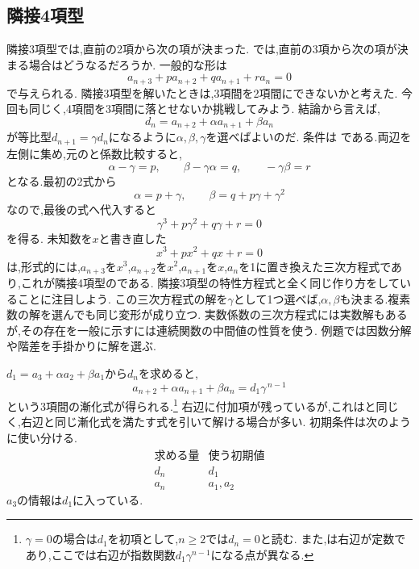 \subsection{隣接4項型}\label{節：隣接4項型}
隣接3項型では,直前の2項から次の項が決まった.
では,直前の3項から次の項が決まる場合はどうなるだろうか.
一般的な形は
\[
  a_{n+3}+pa_{n+2}+qa_{n+1}+ra_n=0
\]
で与えられる.
隣接3項型を解いたときは,3項間を2項間にできないかと考えた.
今回も同じく,4項間を3項間に落とせないか挑戦してみよう.
結論から言えば,
\[
  d_n=a_{n+2}+\alpha a_{n+1}+\beta a_n
\]
が等比型$d_{n+1}=\gamma d_n$になるように$\alpha,\beta,\gamma$を選べばよいのだ.
条件は
\BookMathLayout{\[
    a_{n+3}+\alpha a_{n+2}+\beta a_{n+1}=\gamma \left(a_{n+2}+\alpha a_{n+1}+\beta a_{n}\right)
  \]}{
  \[
    \begin{aligned}
      a_{n+3}+\alpha a_{n+2}+\beta a_{n+1}\\
      {}=\gamma\left(a_{n+2}+\alpha a_{n+1}+\beta a_n\right)
    \end{aligned}
  \]
}
である.両辺を左側に集め,元のと係数比較すると,
\[
  \alpha-\gamma=p,\qquad
  \beta-\gamma\alpha=q,\qquad
  -\gamma\beta=r
\]
となる.最初の2式から
\[
  \alpha=p+\gamma,\qquad
  \beta=q+p\gamma+\gamma^2
\]
なので,最後の式へ代入すると
\[
  \gamma^3+p\gamma^2+q\gamma+r=0
\]
を得る.
未知数を$x$と書き直した
\[
  x^3+px^2+qx+r=0
\]
は,形式的には,$a_{n+3}$を$x^3$,$a_{n+2}$を$x^2$,$a_{n+1}$を$x$,$a_n$を1に置き換えた三次方程式であり,これが隣接4項型のである.
隣接3項型の特性方程式と全く同じ作り方をしていることに注目しよう.
この三次方程式の解を$\gamma$として1つ選べば,$\alpha,\beta$も決まる.複素数の解を選んでも同じ変形が成り立つ.
実数係数の三次方程式には実数解もあるが,その存在を一般に示すには連続関数の中間値の性質を使う.
例題では因数分解や階差を手掛かりに解を選ぶ.

$d_1=a_3+\alpha a_2+\beta a_1$から$d_n$を求めると,
\[
  a_{n+2}+\alpha a_{n+1}+\beta a_n=d_1\gamma^{\,n-1}
\]
という3項間の漸化式が得られる.\footnote{$\gamma=0$の場合は$d_1$を初項として,$n\ge2$では$d_n=0$と読む.
  また,は右辺が定数であり,ここでは右辺が指数関数$d_1\gamma^{n-1}$になる点が異なる.}
右辺に付加項が残っているが,これはと同じく,右辺と同じ漸化式を満たす式を引いて解ける場合が多い.
初期条件は次のように使い分ける.
\[
  \begin{array}{c|c}
    \text{求める量}&\text{使う初期値}\\ \hline
    d_n&d_1\\
    a_n&a_1,a_2
  \end{array}
\]
$a_3$の情報は$d_1$に入っている.

